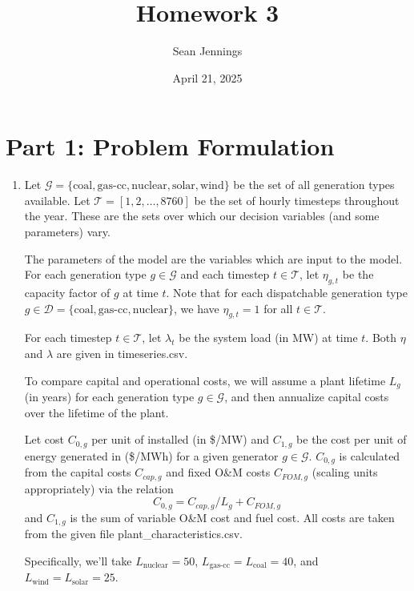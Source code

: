 \documentclass{homework}
\title{Homework 3}
\author{Sean Jennings}
\date{April 21, 2025}
\begin{document}
\maketitle

\newcommand{\G}{\mathcal{G}}
\newcommand{\T}{\mathcal{T}}
\newcommand{\coal}{\text{coal}}
\newcommand{\nuclear}{\text{nuclear}}
\newcommand{\wind}{\text{wind}}
\newcommand{\solar}{\text{solar}}
\newcommand{\gas}{\text{gas-cc}}

\section{Part 1: Problem Formulation}
\begin{enumerate}
\item Let $\G = \{\coal, \gas, \nuclear, \solar, \wind\}$ be the set of all generation types
available. Let $\T = [1, 2, \dots, 8760]$ be the set of hourly timesteps throughout the year. These
are the sets over which our decision variables (and some parameters) vary.

The parameters of the model are the variables which are input to the model. For each generation type $g \in \G$
and each timestep $t \in \T$, let $\eta_{g, t}$ be the capacity factor of $g$ at time $t$. Note that for each 
dispatchable generation type $g \in \mathcal{D} = \{\coal, \gas, \nuclear\}$, we have $\eta_{g,t} = 1$ for
all $t \in \T$.

For each timestep $t\in \T$, let $\lambda_t$ be the system load (in MW) at time $t$. Both $\eta$ and $\lambda$
are given in timeseries.csv.

To compare capital and operational costs, we will assume a plant lifetime $L_g$ (in years) for each generation type $g\in\G$,
and then annualize capital costs over the lifetime of the plant.

Let cost $C_{0,g}$ per unit of installed (in \$/MW)
and $C_{1,g}$ be the cost per unit of energy generated in (\$/MWh) for a given generator $g\in\G$.
$C_{0,g}$ is calculated from the capital costs $C_{cap,g}$ and fixed O\&M costs $C_{FOM,g}$ (scaling units appropriately) via the relation
\begin{equation*}
    C_{0,g} = C_{cap,g} / L_g + C_{FOM,g}
\end{equation*}
and $C_{1,g}$ is the sum of variable O\&M cost and fuel cost. All costs are taken from the
given file plant\_characteristics.csv.

Specifically, we'll take $L_{\text{nuclear}} = 50$, $L_{\text{gas-cc}} = L_{\text{coal}} = 40$, and $L_{\text{wind}} = L_{\text{solar}} = 25$.


\end{enumerate}
\end{document}
